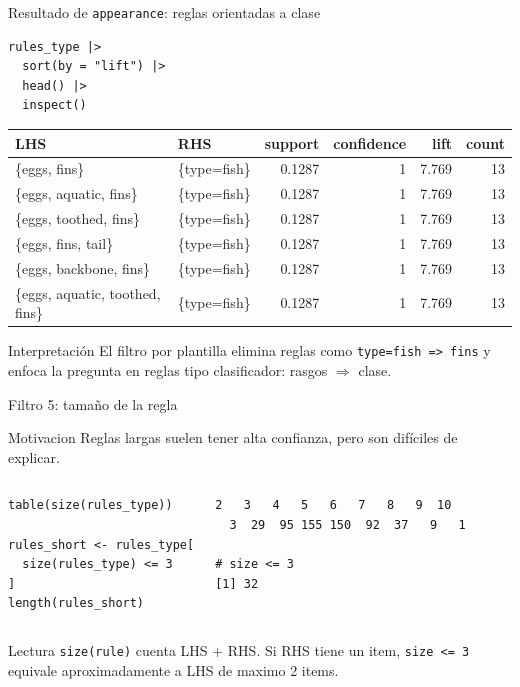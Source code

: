 \documentclass[10pt,aspectratio=169]{beamer}
\begin{document}
\begin{frame}[fragile]{Resultado de \texttt{appearance}: reglas orientadas a clase}
\begin{lstlisting}[style=rcode]
rules_type |>
  sort(by = "lift") |>
  head() |>
  inspect()
\end{lstlisting}

\vspace{0.1cm}
\scriptsize
\begin{tabular}{llrrrr}
\toprule
LHS & RHS & support & confidence & lift & count \\
\midrule
\{eggs, fins\} & \{type=fish\} & 0.1287 & 1 & 7.769 & 13 \\
\{eggs, aquatic, fins\} & \{type=fish\} & 0.1287 & 1 & 7.769 & 13 \\
\{eggs, toothed, fins\} & \{type=fish\} & 0.1287 & 1 & 7.769 & 13 \\
\{eggs, fins, tail\} & \{type=fish\} & 0.1287 & 1 & 7.769 & 13 \\
\{eggs, backbone, fins\} & \{type=fish\} & 0.1287 & 1 & 7.769 & 13 \\
\{eggs, aquatic, toothed, fins\} & \{type=fish\} & 0.1287 & 1 & 7.769 & 13 \\
\bottomrule
\end{tabular}

\begin{alertblock}{Interpretación}
El filtro por plantilla elimina reglas como \texttt{type=fish => fins} y enfoca la pregunta en reglas tipo clasificador: rasgos $\Rightarrow$ clase.
\end{alertblock}
\end{frame}

\begin{frame}[fragile]{Filtro 5: tamaño de la regla}
\begin{block}{Motivacion}
Reglas largas suelen tener alta confianza, pero son difíciles de explicar.
\end{block}

\begin{columns}[T]
\begin{lstlisting}[style=rcode]
table(size(rules_type))

rules_short <- rules_type[
  size(rules_type) <= 3
]
length(rules_short)
\end{lstlisting}

\begin{lstlisting}[style=out]
  2   3   4   5   6   7   8   9  10
  3  29  95 155 150  92  37   9   1

# size <= 3
[1] 32
\end{lstlisting}
\end{columns}

\begin{block}{Lectura}
\texttt{size(rule)} cuenta LHS + RHS. Si RHS tiene un item, \texttt{size <= 3} equivale aproximadamente a LHS de maximo 2 items.
\end{block}
\end{frame}
\end{document}
